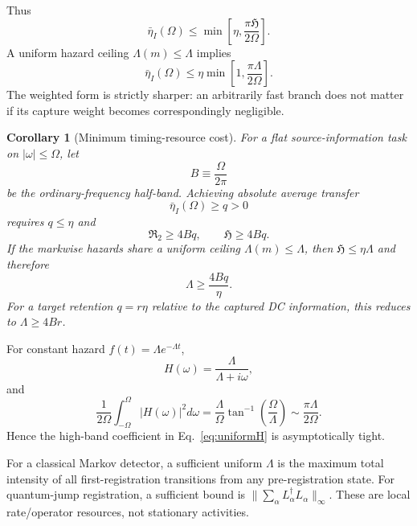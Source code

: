 \documentclass[aps,prapplied,preprint,nofootinbib]{revtex4-2}
\newtheorem{corollary}{Corollary}
\newcommand{\Rtwo}{\mathfrak R_2}
\newcommand{\Hcap}{\mathfrak H}
\begin{document}
Thus
\begin{equation}
\boxed{
\bar\eta_I(\Omega)
\le\min\left[\eta,\frac{\pi\Hcap}{2\Omega}\right].}
\label{eq:Hbound}
\end{equation}
A uniform hazard ceiling $\Lambda(m)\le\Lambda$ implies
\begin{equation}
\bar\eta_I(\Omega)\le
\eta\min\left[1,\frac{\pi\Lambda}{2\Omega}\right].
\label{eq:uniformH}
\end{equation}
The weighted form is strictly sharper: an arbitrarily fast branch does not matter if its capture weight becomes correspondingly negligible.

\begin{corollary}[Minimum timing-resource cost]
For a flat source-information task on $|\omega|\le\Omega$, let
\begin{equation}
B\equiv\frac{\Omega}{2\pi}
\end{equation}
be the ordinary-frequency half-band. Achieving absolute average transfer
\begin{equation}
\bar\eta_I(\Omega)\ge q>0
\end{equation}
requires $q\le\eta$ and
\begin{equation}
\boxed{\Rtwo\ge4Bq,\qquad \Hcap\ge4Bq.}
\label{eq:resourceCost}
\end{equation}
If the markwise hazards share a uniform ceiling $\Lambda(m)\le\Lambda$, then $\Hcap\le\eta\Lambda$ and therefore
\begin{equation}
\boxed{\Lambda\ge\frac{4Bq}{\eta}.}
\label{eq:uniformResourceCost}
\end{equation}
For a target retention $q=r\eta$ relative to the captured DC information, this reduces to $\Lambda\ge4Br$.
\end{corollary}

For constant hazard $f(t)=\Lambda e^{-\Lambda t}$,
\begin{equation}
H(\omega)=\frac{\Lambda}{\Lambda+i\omega},
\end{equation}
and
\begin{equation}
\frac{1}{2\Omega}\int_{-\Omega}^{\Omega}|H(\omega)|^2d\omega
=\frac{\Lambda}{\Omega}\tan^{-1}\!\left(\frac{\Omega}{\Lambda}\right)
\sim\frac{\pi\Lambda}{2\Omega}.
\end{equation}
Hence the high-band coefficient in Eq.~\eqref{eq:uniformH} is asymptotically tight.

For a classical Markov detector, a sufficient uniform $\Lambda$ is the maximum total intensity of all first-registration transitions from any pre-registration state. For quantum-jump registration, a sufficient bound is $\|\sum_\alpha L_\alpha^\dagger L_\alpha\|_\infty$. These are local rate/operator resources, not stationary activities.
\end{document}
